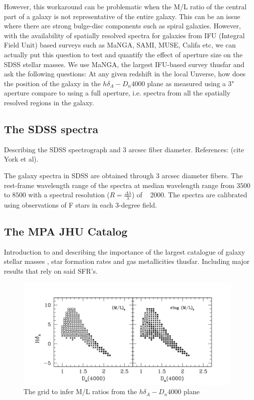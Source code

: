 However, this workaround can be problematic when the M/L ratio of the central part of a galaxy is not representative of the entire galaxy. This can be an issue where there are strong bulge-disc components such as spiral galaxies. However, with the availability of spatially resolved spectra for galaxies from IFU (Integral Field Unit) based surveys such as MaNGA, SAMI, MUSE, Califa etc, we can actually put this question to test and quantify the effect of aperture size on the SDSS stellar masses. We use MaNGA, the largest IFU-based survey thusfar and ask the following questions: At any given redshift in the local Unverse, how does the position of the galaxy in the $h\delta_{A}-D_{n}4000$ plane as measured using a $3$" aperture compare to using a full aperture, i.e. spectra from all the spatially resolved regions in the galaxy.\\


\subsection{The SDSS spectra}
Describing the SDSS spectrograph and $3$ arcsec fiber diameter. References: \citep{smee_multi-object_2013} (cite York et al).

The galaxy spectra in SDSS are obtained through $3$ arcsec diameter fibers. The rest-frame wavelength range of the spectra at median wavelength range from $3500$ to $8500$ with a spectral resolution ($R = \frac{\Delta\lambda}{\lambda}$) of ~ 2000. The spectra are calibrated using observations of F stars in each 3-degree field.

\subsection{The MPA JHU Catalog}
Introduction to and describing the importance of the largest catalogue of galaxy stellar masses \citep{kauffmann_stellar_2003}, star formation rates \citep{brinchmann_physical_2004} and gas metallicities \citep{tremonti_origin_2004} thusfar. Including major results that rely on said SFR's.

\begin{figure}
\includegraphics[width=\textwidth]{figures/Kauffmann_grid}
\caption[Short figure name.]{The \citet{kauffmann_stellar_2003} grid to infer M/L ratios from the $h\delta_{A}-D_{n}4000$ plane
\label{fig:myInlineFigure}}
\end{figure}

